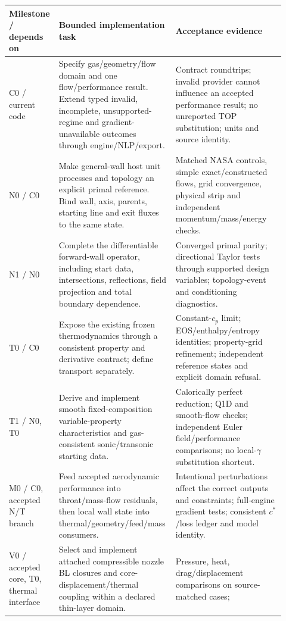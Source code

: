 \begingroup\small
\begin{longtable}{@{}P{0.14\linewidth}P{0.39\linewidth}P{0.39\linewidth}@{}}
\toprule\textbf{Milestone / depends on} & \textbf{Bounded implementation task} &
\textbf{Acceptance evidence}\\\midrule
\endhead
C0 / current code &
Specify gas/geometry/flow domain and one flow/performance result.
Extend typed invalid, incomplete, unsupported-regime and gradient-unavailable
outcomes through engine/NLP/export. &
Contract roundtrips; invalid provider cannot influence an accepted
performance result; no unreported TOP substitution; units and source identity.\\
N0 / C0 &
Make general-wall host unit processes and topology an explicit primal
reference. Bind wall, axis, parents, starting line and exit fluxes to
the same state. &
Matched NASA controls, simple exact/constructed flows, grid convergence,
physical strip and independent momentum/mass/energy checks.\\
N1 / N0 &
Complete the differentiable forward-wall operator, including start data,
intersections, reflections, field projection and total boundary dependence. &
Converged primal parity; directional Taylor tests through supported
design variables; topology-event and conditioning diagnostics.\\
T0 / C0 &
Expose the existing frozen thermodynamics through a consistent property
and derivative contract; define transport separately. &
Constant-\(c_p\) limit; EOS/enthalpy/entropy identities; property-grid
refinement; independent reference states and explicit domain refusal.\\
T1 / N0, T0 &
Derive and implement smooth fixed-composition variable-property
characteristics and gas-consistent sonic/transonic starting data. &
Calorically perfect reduction; Q1D and smooth-flow checks; independent
Euler field/performance comparisons; no local-\(\gamma\) substitution shortcut.\\
M0 / C0, accepted N/T branch &
Feed accepted aerodynamic performance into throat/mass-flow residuals,
then local wall state into thermal/geometry/feed/mass consumers. &
Intentional perturbations affect the correct outputs and constraints;
full-engine gradient tests; consistent \(c^*\)/loss ledger and model identity.\\
V0 / accepted core, T0, thermal interface &
Select and implement attached compressible nozzle BL closures and
core-displacement/thermal coupling within a declared thin-layer domain. &
Pressure, heat, drag/displacement comparisons on source-matched cases;

\end{longtable}
